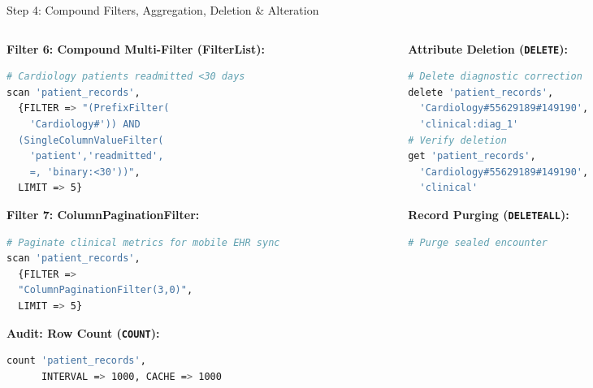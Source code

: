 \documentclass[aspectratio=169]{beamer}
\begin{document}
\begin{frame}[fragile,shrink=3]{Step 4: Compound Filters, Aggregation, Deletion \& Alteration}
    \begin{columns}[T]
        \begin{column}{0.48\textwidth}
            \textbf{\textcolor{NavyBlue}{Filter 6: Compound Multi-Filter (FilterList):}}
            \begin{lstlisting}[language=bash]
# Cardiology patients readmitted <30 days
scan 'patient_records', 
  {FILTER => "(PrefixFilter(
    'Cardiology#')) AND 
  (SingleColumnValueFilter(
    'patient','readmitted',
    =, 'binary:<30'))", 
  LIMIT => 5}
            \end{lstlisting}
            \vspace{0.05cm}
            \textbf{\textcolor{NavyBlue}{Filter 7: ColumnPaginationFilter:}}
            \begin{lstlisting}[language=bash]
# Paginate clinical metrics for mobile EHR sync
scan 'patient_records', 
  {FILTER => 
  "ColumnPaginationFilter(3,0)",
  LIMIT => 5}
            \end{lstlisting}
            \vspace{0.05cm}
            \textbf{\textcolor{NavyBlue}{Audit: Row Count (\texttt{COUNT}):}}
            \begin{lstlisting}[language=bash]
count 'patient_records', 
      INTERVAL => 1000, CACHE => 1000
            \end{lstlisting}
        \end{column}
        \begin{column}{0.48\textwidth}
            \textbf{\textcolor{AmritaMaroon}{Attribute Deletion (\texttt{DELETE}):}}
            \begin{lstlisting}[language=bash]
# Delete diagnostic correction
delete 'patient_records', 
  'Cardiology#55629189#149190', 
  'clinical:diag_1'
# Verify deletion
get 'patient_records', 
  'Cardiology#55629189#149190', 
  'clinical'
            \end{lstlisting}
            \vspace{0.05cm}
            \textbf{\textcolor{AmritaMaroon}{Record Purging (\texttt{DELETEALL}):}}
            \begin{lstlisting}[language=bash]
# Purge sealed encounter

\end{lstlisting}
\end{column}
\end{columns}
\end{frame}
\end{document}
